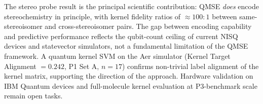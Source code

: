 The stereo probe result is the principal scientific contribution: QMSE
\emph{does} encode stereochemistry in principle, with kernel fidelity ratios
of $\approx 100:1$ between same-stereoisomer and cross-stereoisomer pairs.
The gap between encoding capability and predictive performance reflects the
qubit-count ceiling of current NISQ devices and statevector simulators, not
a fundamental limitation of the QMSE framework. A quantum kernel SVM on the
Aer simulator (Kernel Target Alignment $= 0.242$, P1 Set A, $n = 17$)
confirms non-trivial label alignment of the kernel matrix, supporting the
direction of the approach. Hardware validation on IBM Quantum devices and
full-molecule kernel evaluation at P3-benchmark scale remain open tasks.
